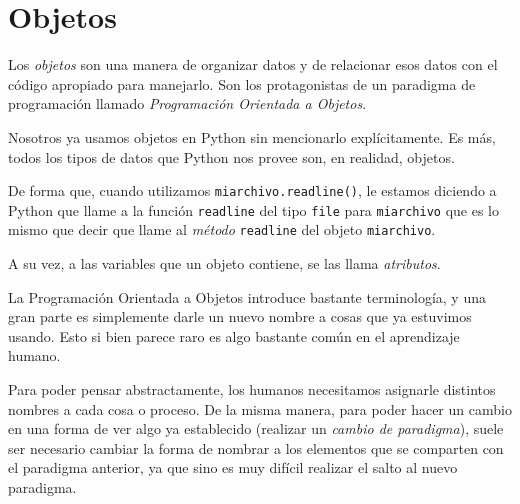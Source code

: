 
%

\chapter{Objetos}


Los {\it objetos} son una manera de organizar datos y de relacionar esos datos
con el código apropiado para manejarlo.  Son los protagonistas de un
paradigma de programación llamado {\it Programación Orientada a Objetos}.

Nosotros ya usamos objetos en Python sin mencionarlo explícitamente. Es más,
todos los tipos de datos que Python nos provee son, en realidad, objetos.

De forma que, cuando utilizamos \lstinline!miarchivo.readline()!, le estamos
diciendo a Python que llame a la función \lstinline!readline! del tipo
\lstinline!file! para \lstinline!miarchivo! que es lo mismo que decir que
llame al {\it método} \lstinline!readline! del objeto \lstinline!miarchivo!.

A su vez, a las variables que un objeto contiene, se las llama {\it
atributos}.

\begin{sabias_que}
La Programación Orientada a Objetos introduce bastante terminología, y una
gran parte es simplemente darle un nuevo nombre a cosas que ya estuvimos
usando.  Esto si bien parece raro es algo bastante común en el aprendizaje
humano.

Para poder pensar abstractamente, los humanos necesitamos asignarle
distintos nombres a cada cosa o proceso. De la misma manera, para poder
hacer un cambio en una forma de ver algo ya establecido (realizar un {\it
cambio de paradigma}), suele ser necesario cambiar la forma de nombrar a
los elementos que se comparten con el paradigma anterior, ya que sino es
muy difícil realizar el salto al nuevo paradigma.
\end{sabias_que}

